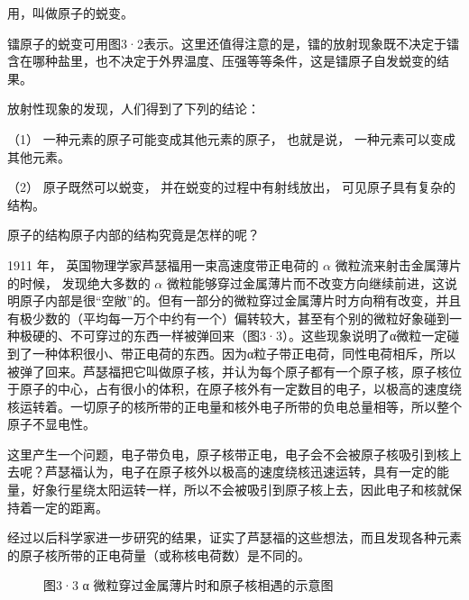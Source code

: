 用，叫做原子的蜕变。

镭原子的蜕变可用图3·2表示。这里还值得注意的是，镭的放射现象既不决定于镭含在哪种盐里，也不决定于外界温度、压强等等条件，这是镭原子自发蜕变的结果。

放射性现象的发现，人们得到了下列的结论：

（1） 一种元素的原子可能变成其他元素的原子， 也就是说，
一种元素可以变成其他元素。

（2） 原子既然可以蜕变， 并在蜕变的过程中有射线放出，
可见原子具有复杂的结构。

原子的结构原子内部的结构究竟是怎样的呢？

1911 年， 英国物理学家芦瑟福用一束高速度带正电荷的 \(\alpha\)
微粒流来射击金属薄片的时候， 发现绝大多数的 \(\alpha\)
微粒能够穿过金属薄片而不改变方向继续前进，这说明原子内部是很``空敞''的。但有一部分的微粒穿过金属薄片时方向稍有改变，并且有极少数的（平均每一万个中约有一个）偏转较大，甚至有个别的微粒好象碰到一种极硬的、不可穿过的东西一样被弹回来（图3·3）。这些现象说明了α微粒一定碰到了一种体积很小、带正电荷的东西。因为α粒子带正电荷，同性电荷相斥，所以被弹了回来。芦瑟福把它叫做原子核，并认为每个原子都有一个原子核，原子核位于原子的中心，占有很小的体积，在原子核外有一定数目的电子，以极高的速度绕核运转着。一切原子的核所带的正电量和核外电子所带的负电总量相等，所以整个原子不显电性。

这里产生一个问题，电子带负电，原子核带正电，电子会不会被原子核吸引到核上去呢？芦瑟福认为，电子在原子核外以极高的速度绕核迅速运转，具有一定的能量，好象行星绕太阳运转一样，所以不会被吸引到原子核上去，因此电子和核就保持着一定的距离。

经过以后科学家进一步研究的结果，证实了芦瑟福的这些想法，而且发现各种元素的原子核所带的正电荷量（或称核电荷数）是不同的。

\begin{figure}
\centering
{}
\caption{图3·3 α 微粒穿过金属薄片时和原子核相遇的示意图}
\end{figure}

